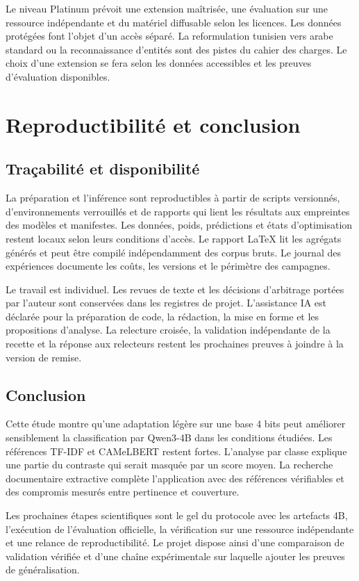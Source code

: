 Le niveau Platinum prévoit une extension maîtrisée, une évaluation sur une ressource indépendante et du matériel diffusable selon les licences. Les données protégées font l’objet d’un accès séparé. La reformulation tunisien vers arabe standard ou la reconnaissance d’entités sont des pistes du cahier des charges. Le choix d’une extension se fera selon les données accessibles et les preuves d’évaluation disponibles.

\section{Reproductibilité et conclusion}\label{sec:conclusion}

\subsection{Traçabilité et disponibilité}
La préparation et l’inférence sont reproductibles à partir de scripts versionnés, d’environnements verrouillés et de rapports qui lient les résultats aux empreintes des modèles et manifestes. Les données, poids, prédictions et états d’optimisation restent locaux selon leurs conditions d’accès. Le rapport LaTeX lit les agrégats générés et peut être compilé indépendamment des corpus bruts. Le journal des expériences documente les coûts, les versions et le périmètre des campagnes.

Le travail est individuel. Les revues de texte et les décisions d’arbitrage portées par l’auteur sont conservées dans les registres de projet. L’assistance IA est déclarée pour la préparation de code, la rédaction, la mise en forme et les propositions d’analyse. La relecture croisée, la validation indépendante de la recette et la réponse aux relecteurs restent les prochaines preuves à joindre à la version de remise.

\subsection{Conclusion}
Cette étude montre qu’une adaptation légère sur une base 4 bits peut améliorer sensiblement la classification par Qwen3-4B dans les conditions étudiées. Les références TF-IDF et CAMeLBERT restent fortes. L’analyse par classe explique une partie du contraste qui serait masquée par un score moyen. La recherche documentaire extractive complète l’application avec des références vérifiables et des compromis mesurés entre pertinence et couverture.

Les prochaines étapes scientifiques sont le gel du protocole avec les artefacts 4B, l’exécution de l’évaluation officielle, la vérification sur une ressource indépendante et une relance de reproductibilité. Le projet dispose ainsi d’une comparaison de validation vérifiée et d’une chaîne expérimentale sur laquelle ajouter les preuves de généralisation.
\FloatBarrier
